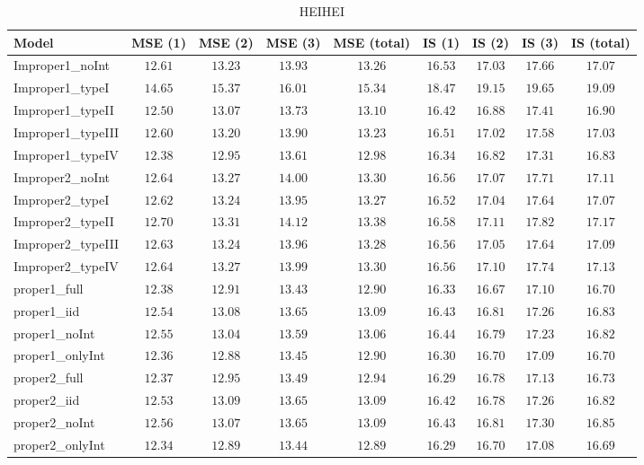 \begin{table}

\caption{\label{tab:model-choice-sc4}HEIHEI}
\centering
\begin{tabular}{lcccccccc}
\hline
Model  & MSE (1) & MSE (2) & MSE (3) & MSE (total) & IS (1) & IS (2) & IS (3) & \multicolumn{1}{c}{IS (total)} \\ 
\hline
Improper1_noInt  & $12.61$ & $13.23$ & $13.93$ & $13.26$ & $16.53$ & $17.03$ & $17.66$ & $17.07$ \\
Improper1_typeI  & $14.65$ & $15.37$ & $16.01$ & $15.34$ & $18.47$ & $19.15$ & $19.65$ & $19.09$ \\
Improper1_typeII  & $12.50$ & $13.07$ & $13.73$ & $13.10$ & $16.42$ & $16.88$ & $17.41$ & $16.90$ \\
Improper1_typeIII  & $12.60$ & $13.20$ & $13.90$ & $13.23$ & $16.51$ & $17.02$ & $17.58$ & $17.03$ \\
Improper1_typeIV  & $12.38$ & $12.95$ & $13.61$ & $12.98$ & $16.34$ & $16.82$ & $17.31$ & $16.83$ \\
Improper2_noInt  & $12.64$ & $13.27$ & $14.00$ & $13.30$ & $16.56$ & $17.07$ & $17.71$ & $17.11$ \\
Improper2_typeI  & $12.62$ & $13.24$ & $13.95$ & $13.27$ & $16.52$ & $17.04$ & $17.64$ & $17.07$ \\
Improper2_typeII  & $12.70$ & $13.31$ & $14.12$ & $13.38$ & $16.58$ & $17.11$ & $17.82$ & $17.17$ \\
Improper2_typeIII  & $12.63$ & $13.24$ & $13.96$ & $13.28$ & $16.56$ & $17.05$ & $17.64$ & $17.09$ \\
Improper2_typeIV  & $12.64$ & $13.27$ & $13.99$ & $13.30$ & $16.56$ & $17.10$ & $17.74$ & $17.13$ \\
proper1_full  & $12.38$ & $12.91$ & $13.43$ & $12.90$ & $16.33$ & $16.67$ & $17.10$ & $16.70$ \\
proper1_iid  & $12.54$ & $13.08$ & $13.65$ & $13.09$ & $16.43$ & $16.81$ & $17.26$ & $16.83$ \\
proper1_noInt  & $12.55$ & $13.04$ & $13.59$ & $13.06$ & $16.44$ & $16.79$ & $17.23$ & $16.82$ \\
proper1_onlyInt  & $12.36$ & $12.88$ & $13.45$ & $12.90$ & $16.30$ & $16.70$ & $17.09$ & $16.70$ \\
proper2_full  & $12.37$ & $12.95$ & $13.49$ & $12.94$ & $16.29$ & $16.78$ & $17.13$ & $16.73$ \\
proper2_iid  & $12.53$ & $13.09$ & $13.65$ & $13.09$ & $16.42$ & $16.78$ & $17.26$ & $16.82$ \\
proper2_noInt  & $12.56$ & $13.07$ & $13.65$ & $13.09$ & $16.43$ & $16.81$ & $17.30$ & $16.85$ \\
proper2_onlyInt  & $12.34$ & $12.89$ & $13.44$ & $12.89$ & $16.29$ & $16.70$ & $17.08$ & $16.69$ \\
\hline 
\end{tabular}


\end{table}
